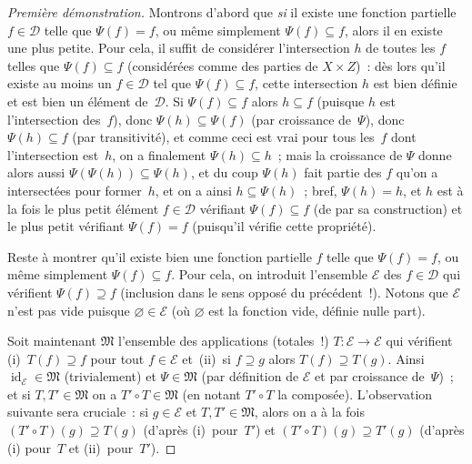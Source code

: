 \documentclass[12pt,a4paper]{article}
\theoremstyle{definition}
\newcommand{\id}{\operatorname{id}}
\begin{document}
\begin{proof}[Première démonstration]
Montrons d'abord que \emph{si} il existe une fonction partielle $f \in
\mathscr{D}$ telle que $\Psi(f) = f$, ou même simplement $\Psi(f)
\subseteq f$, alors il en existe une plus petite.  Pour cela, il
suffit de considérer l'intersection $h$ de toutes les $f$ telles que
$\Psi(f) \subseteq f$ (considérées comme des parties de $X\times Z$) :
dès lors qu'il existe au moins un $f \in \mathscr{D}$ tel que $\Psi(f)
\subseteq f$, cette intersection $h$ est bien définie et est bien un
élément de $\mathscr{D}$.  Si $\Psi(f) \subseteq f$ alors $h \subseteq
f$ (puisque $h$ est l'intersection des $f$), donc $\Psi(h) \subseteq
\Psi(f)$ (par croissance de $\Psi$), donc $\Psi(h) \subseteq f$ (par
transitivité), et comme ceci est vrai pour tous les $f$ dont
l'intersection est $h$, on a finalement $\Psi(h) \subseteq h$ ; mais
la croissance de $\Psi$ donne alors aussi $\Psi(\Psi(h)) \subseteq
\Psi(h)$, et du coup $\Psi(h)$ fait partie des $f$ qu'on a
intersectées pour former $h$, et on a ainsi $h \subseteq \Psi(h)$ ;
bref, $\Psi(h) = h$, et $h$ est à la fois le plus petit élément $f \in
\mathscr{D}$ vérifiant $\Psi(f) \subseteq f$ (de par sa construction)
et le plus petit vérifiant $\Psi(f) = f$ (puisqu'il vérifie cette
propriété).

Reste à montrer qu'il existe bien une fonction partielle $f$ telle que
$\Psi(f) = f$, ou même simplement $\Psi(f) \subseteq f$.  Pour cela,
on introduit l'ensemble $\mathscr{E}$ des $f \in \mathscr{D}$ qui
vérifient $\Psi(f) \supseteq f$ (inclusion dans le sens opposé du
précédent !).  Notons que $\mathscr{E}$ n'est pas vide puisque
$\varnothing \in \mathscr{E}$ (où $\varnothing$ est la fonction vide,
définie nulle part).

Soit maintenant $\mathfrak{M}$ l'ensemble des applications (totales !)
$T\colon\mathscr{E}\to\mathscr{E}$ qui vérifient (i) $T(f) \supseteq
f$ pour tout $f\in \mathscr{E}$ et (ii) si $f \supseteq g$ alors $T(f)
\supseteq T(g)$.  Ainsi $\id_{\mathscr{E}} \in \mathfrak{M}$
(trivialement) et $\Psi \in \mathfrak{M}$ (par définition de
$\mathscr{E}$ et par croissance de $\Psi$) ; et si $T, T' \in
\mathfrak{M}$ on a $T'\circ T \in \mathfrak{M}$ (en notant $T'\circ T$
la composée).  L'observation suivante sera cruciale : si $g \in
\mathscr{E}$ et $T, T' \in \mathfrak{M}$, alors on a à la fois
$(T'\circ T)(g) \supseteq T(g)$ (d'après (i) pour $T'$) et $(T'\circ
T)(g) \supseteq T'(g)$ (d'après (i) pour $T$ et (ii) pour $T'$).


\end{proof}
\end{document}
